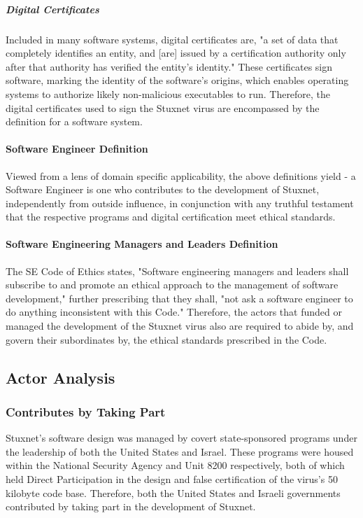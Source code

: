 \documentclass[12pt]{article}
\begin{document}
\begin{multicols}{2}
\subparagraph{Digital Certificates}
Included in many software systems, digital certificates are, "a set of data that completely identifies an entity, and [are] issued by a certification authority only after that authority has verified the entity's identity."\cite{digitalCertificateDefintion} These certificates sign software, marking the identity of the software's origins, which enables operating systems to authorize likely non-malicious executables to run. Therefore, the digital certificates used to sign the Stuxnet virus are encompassed by the definition for a software system.

\paragraph{Software Engineer Definition}

Viewed from a lens of domain specific applicability, the above definitions yield - a Software Engineer is one who contributes to the development of Stuxnet, independently from outside influence, in conjunction with any truthful testament that the respective programs and digital certification meet ethical standards.

\paragraph{Software Engineering Managers and Leaders Definition}

The SE Code of Ethics states, "Software engineering managers and leaders shall subscribe to and promote an ethical approach to the management of software development," further prescribing that they shall, "not ask a software engineer to do anything inconsistent with this Code."\cite{softwareEngineeringCodeOfEthics} Therefore, the actors that funded or managed the development of the Stuxnet virus also are required to abide by, and govern their subordinates by, the ethical standards prescribed in the Code.


\subsection{Actor Analysis}

\subsubsection{Contributes by Taking Part}

Stuxnet's software design was managed by covert state-sponsored programs under the leadership of both the United States and Israel. These programs were housed within the National Security Agency and Unit 8200 respectively, both of which held Direct Participation in the design and false certification of the virus's 50 kilobyte code base.\cite{NationalSecurityAgencyAndUnit8200}\cite{w32.stuxnetDossier} Therefore, both the United States and Israeli governments contributed by taking part in the development of Stuxnet.


\end{multicols}
\end{document}
